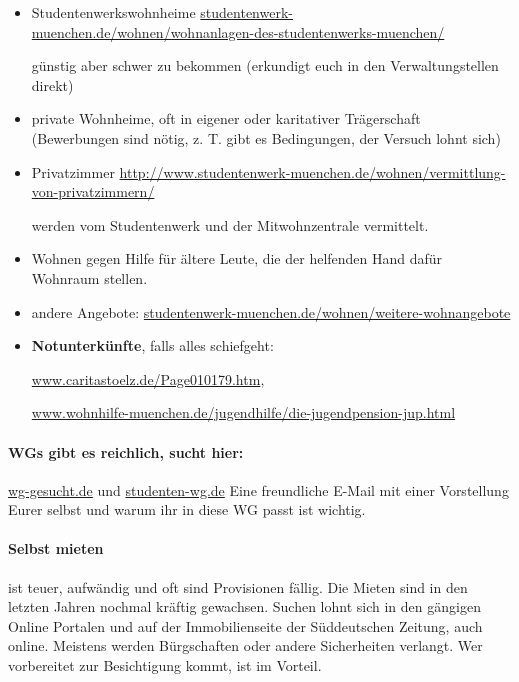 \begin{itemize}
\item Studentenwerkswohnheime \newline \url{studentenwerk-muenchen.de/wohnen/wohnanlagen-des-studentenwerks-muenchen/}

  günstig aber schwer zu bekommen (erkundigt euch in den Verwaltungstellen direkt)
\item private Wohnheime, oft in eigener oder karitativer Trägerschaft
  (Bewerbungen sind nötig, z. T. gibt es Bedingungen, der Versuch lohnt sich)
\item
  Privatzimmer \newline \url{http://www.studentenwerk-muenchen.de/wohnen/vermittlung-von-privatzimmern/}
  
werden vom Studentenwerk und der Mitwohnzentrale vermittelt.
\item Wohnen gegen Hilfe für ältere Leute, die der helfenden Hand dafür
  Wohnraum stellen.
\item andere Angebote: \url{studentenwerk-muenchen.de/wohnen/weitere-wohnangebote}
\item {\bf Notunterkünfte}, falls alles schiefgeht:

 \url{www.caritastoelz.de/Page010179.htm},

  \url{www.wohnhilfe-muenchen.de/jugendhilfe/die-jugendpension-jup.html}
\end{itemize}

\paragraph{WGs gibt es reichlich, sucht hier:}
\url{wg-gesucht.de} und \url{studenten-wg.de}\newline
Eine freundliche E-Mail mit einer Vorstellung Eurer selbst und warum ihr
in diese WG passt ist wichtig.

\paragraph{Selbst mieten} ist teuer, aufwändig und oft sind Provisionen
fällig. Die Mieten sind in den letzten Jahren nochmal kräftig gewachsen.
Suchen
lohnt sich in den gängigen Online Portalen und auf der Immobilienseite der
Süddeutschen Zeitung, auch online. Meistens werden Bürgschaften oder andere
Sicherheiten verlangt.  Wer vorbereitet zur Besichtigung kommt, ist im Vorteil.

